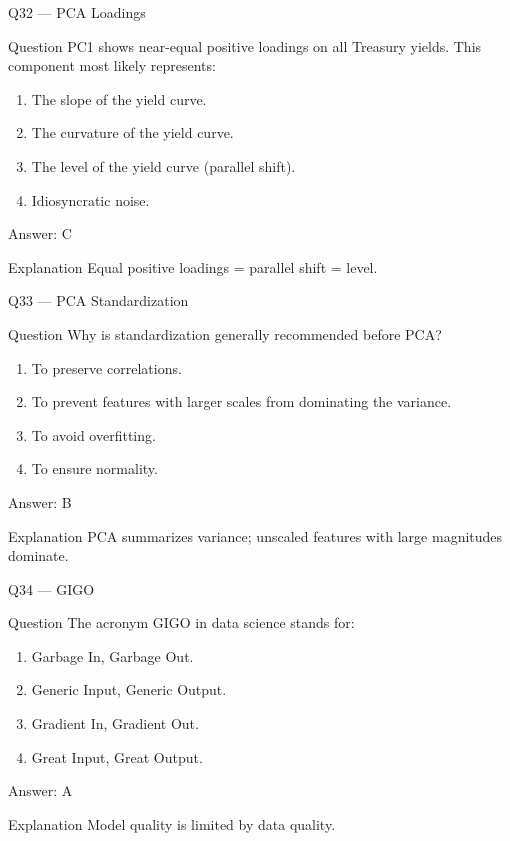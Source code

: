 \documentclass[aspectratio=169,8pt]{beamer}
\begin{document}
	\begin{frame}{Q32 --- PCA Loadings}
		\begin{block}{Question}
			PC1 shows near-equal positive loadings on all Treasury yields. This component most likely represents:
		\end{block}
		\begin{enumerate}
			\item The slope of the yield curve.
			\item The curvature of the yield curve.
			\item The level of the yield curve (parallel shift).
			\item Idiosyncratic noise.
		\end{enumerate}
		\begin{exampleblock}{Answer: C}\end{exampleblock}
		\begin{block}{Explanation}
			Equal positive loadings = parallel shift = level.
		\end{block}
	\end{frame}
	
	\begin{frame}{Q33 --- PCA Standardization}
		\begin{block}{Question}
			Why is standardization generally recommended before PCA?
		\end{block}
		\begin{enumerate}
			\item To preserve correlations.
			\item To prevent features with larger scales from dominating the variance.
			\item To avoid overfitting.
			\item To ensure normality.
		\end{enumerate}
		\begin{exampleblock}{Answer: B}\end{exampleblock}
		\begin{block}{Explanation}
			PCA summarizes variance; unscaled features with large magnitudes dominate.
		\end{block}
	\end{frame}
	
	\begin{frame}{Q34 --- GIGO}
		\begin{block}{Question}
			The acronym GIGO in data science stands for:
		\end{block}
		\begin{enumerate}
			\item Garbage In, Garbage Out.
			\item Generic Input, Generic Output.
			\item Gradient In, Gradient Out.
			\item Great Input, Great Output.
		\end{enumerate}
		\begin{exampleblock}{Answer: A}\end{exampleblock}
		\begin{block}{Explanation}
			Model quality is limited by data quality.
		\end{block}
	\end{frame}
	
\end{document}
